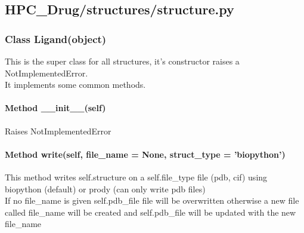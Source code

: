 

\subsection{HPC\_Drug/structures/structure.py}

    \subsubsection{Class Ligand(object)}

        This is the super class for all structures, it's constructor raises a NotImplementedError.\\
        It implements some common methods.

        \paragraph{Method \_\_init\_\_(self)}

            Raises NotImplementedError

        \paragraph{Method write(self, file\_name = None, struct\_type = 'biopython')}
        
            This method writes self.structure on a {self.file\_type} file (pdb, cif) using biopython (default) or prody (can only write pdb files)\\
            If no file\_name is given self.pdb\_file file will be overwritten otherwise a new file called file\_name will be created and self.pdb\_file will be updated with the new file\_name

